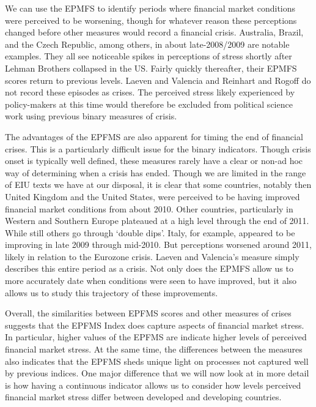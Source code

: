 \documentclass[]{article}
\begin{document}
We can use the EPMFS to identify periods where financial market
conditions were perceived to be worsening, though for whatever reason
these perceptions changed before other measures would record a financial
crisis. Australia, Brazil, and the Czech Republic, among others, in
about late-2008/2009 are notable examples. They all see noticeable
spikes in perceptions of stress shortly after Lehman Brothers collapsed
in the US. Fairly quickly thereafter, their EPMFS scores return to
previous levels. Laeven and Valencia and Reinhart and Rogoff do not
record these episodes as crises. The perceived stress likely experienced
by policy-makers at this time would therefore be excluded from political
science work using previous binary measures of crisis.

The advantages of the EPFMS are also apparent for timing the end of financial crises. This is a particularly difficult issue for the binary indicators. Though crisis onset is typically well defined, these measures rarely have a clear or non-ad hoc way of determining when a crisis has ended. Though we are limited in the range of EIU texts we have at our disposal, it is clear that some countries, notably then United Kingdom and the United States, were perceived to be having improved financial market conditions from about 2010. Other countries, particularly in Western and Southern Europe plateaued at a high level through the end of 2011. While still others go through `double dips'. Italy, for example, appeared to be improving in late 2009 through mid-2010. But perceptions worsened around 2011, likely in relation to the Eurozone crisis. Laeven and Valencia's measure simply describes this entire period as a crisis. Not only does the EPMFS allow us to more accurately date when conditions were seen to have improved, but it also allows us to study this trajectory of these improvements.

Overall, the similarities between EPFMS scores and other measures of crises suggests that the EPFMS Index does capture aspects of financial market stress. In particular, higher values of the EPFMS are indicate higher levels of perceived financial market stress. At the same
time, the differences between the measures also indicates that the EPFMS
sheds unique light on processes not captured well by previous indices.
One major difference that we will now look at in more detail is how
having a continuous indicator allows us to consider how levels perceived
financial market stress differ between developed and developing
countries.
\end{document}
